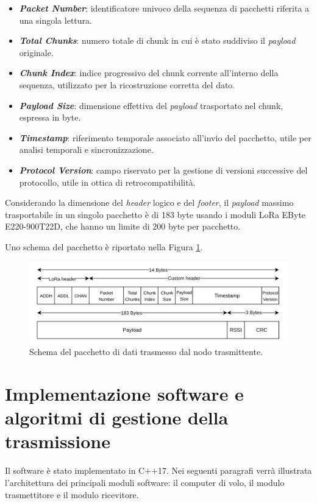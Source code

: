 \documentclass[12pt,a4paper,twoside]{book}
\begin{document}
\begin{itemize}
    \item \textbf{\emph{Packet Number}}: identificatore univoco della sequenza di pacchetti riferita a una singola lettura.
    \item \textbf{\emph{Total Chunks}}: numero totale di chunk in cui è stato suddiviso il \emph{payload} originale.
    \item \textbf{\emph{Chunk Index}}: indice progressivo del chunk corrente all'interno della sequenza, utilizzato per la ricostruzione corretta del dato.
    \item \textbf{\emph{Payload Size}}: dimensione effettiva del \emph{payload} trasportato nel chunk, espressa in byte.
    \item \textbf{\emph{Timestamp}}: riferimento temporale associato all’invio del pacchetto, utile per analisi temporali e sincronizzazione.
    \item \textbf{\emph{Protocol Version}}: campo riservato per la gestione di versioni successive del protocollo, utile in ottica di retrocompatibilità.
\end{itemize}

Considerando la dimensione del \emph{header} logico e del \emph{footer}, il 
\emph{payload} massimo trasportabile in un singolo pacchetto è di 183 byte 
usando i moduli \ac{LoRa} EByte E220-900T22D, che hanno un limite di 200 byte 
per pacchetto.

Uno schema del pacchetto è riportato nella Figura \ref{fig:packet-schema}.
\begin{figure}[H]
    \centering
    \includegraphics[width=\textwidth]{img/protocol-packet.png}
    \caption{Schema del pacchetto di dati trasmesso dal nodo trasmittente.}
    \label{fig:packet-schema}
\end{figure}
\section{Implementazione software e algoritmi di gestione della trasmissione}
Il software è stato implementato in C++17. Nei seguenti paragrafi verrà illustrata
l'architettura dei principali moduli software: il computer di volo,
il modulo trasmettitore e il modulo ricevitore.
\end{document}
